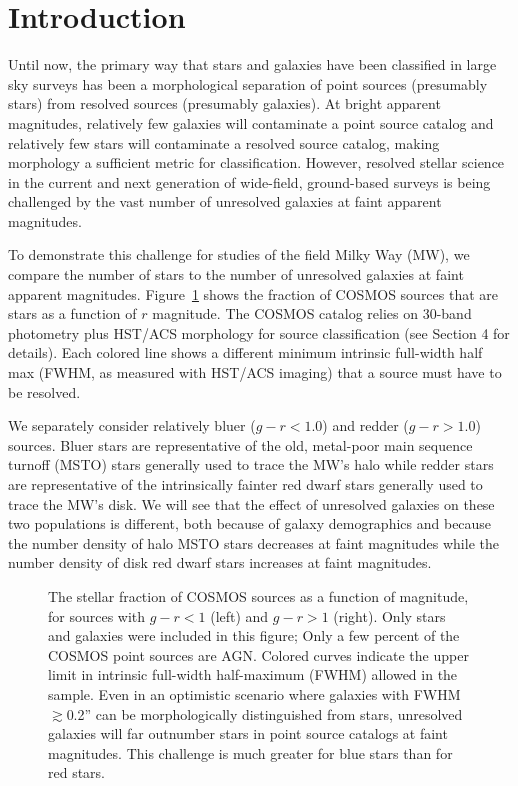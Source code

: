 \documentclass[12pt,preprint]{aastex}
\begin{document}
%
%
\section{Introduction}

Until now, the primary way that stars and galaxies have been
classified in large sky surveys has been a morphological separation
\citep[e.g.,][]{kron80,yee91,vasconcellos11a,henrion11a} of point
sources (presumably stars) from resolved sources (presumably
galaxies).  At bright apparent magnitudes, relatively few galaxies
will contaminate a point source catalog and relatively few stars will
contaminate a resolved source catalog, making morphology a sufficient
metric for classification.  However, resolved stellar science in the
current and next generation of wide-field, ground-based surveys is
being challenged by the vast number of unresolved galaxies at faint
apparent magnitudes.  

To demonstrate this challenge for studies of the field Milky Way (MW),
we compare the number of stars to the number of unresolved galaxies at
faint apparent magnitudes.  Figure~\ref{fig:stellarfraction} shows the
fraction of COSMOS sources that are stars as a function of $r$
magnitude.  The COSMOS catalog \citep[($l,b$) $\sim$ (237,43)
degrees][]{capak07a,scoville07b,ilbert09} relies on 30-band photometry
plus HST/ACS morphology for source classification (see Section 4 for
details).  Each colored line shows a different minimum intrinsic
full-width half max (FWHM, as measured with HST/ACS imaging) that a
source must have to be resolved.

We separately consider relatively bluer ($g-r < 1.0$) and redder ($g-r
> 1.0$) sources.  Bluer stars are representative of the old,
metal-poor main sequence turnoff (MSTO) stars generally used to trace
the MW's halo while redder stars are representative of the
intrinsically fainter red dwarf stars generally used to trace the MW's
disk.  We will see that the effect of unresolved galaxies on these two
populations is different, both because of galaxy demographics and
because the number density of halo MSTO stars decreases at faint
magnitudes while the number density of disk red dwarf stars increases at
faint magnitudes.

\begin{figure}
\centering
\caption{The stellar fraction of COSMOS sources as a function of
  magnitude, for sources with $g-r<1$ (left) and $g-r>1$ (right).
  Only stars and galaxies were included in this figure; Only a few
  percent of the COSMOS point sources are AGN.  Colored curves
  indicate the upper limit in intrinsic full-width half-maximum
  (FWHM) allowed in the sample.  Even in an optimistic scenario where
  galaxies with FWHM $\gtrsim$0.2'' can be morphologically distinguished
  from stars, unresolved galaxies will far outnumber stars in point
  source catalogs at faint magnitudes.  This challenge is much greater
  for blue stars than for red stars.}
\label{fig:stellarfraction}
\end{figure}
 
\end{document}
